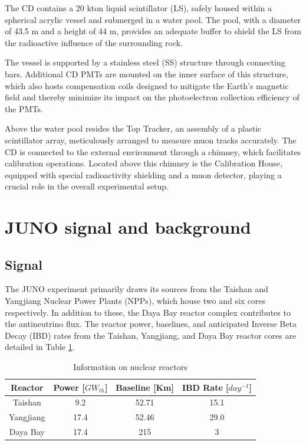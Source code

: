 The CD contains a 20 kton liquid scintillator (LS), safely housed within a spherical acrylic vessel and submerged in a water pool. The pool, with a diameter of 43.5 m and a height of 44 m, provides an adequate buffer to shield the LS from the radioactive influence of the surrounding rock.

The vessel is supported by a stainless steel (SS) structure through connecting bars. Additional CD PMTs are mounted on the inner surface of this structure, which also hosts compensation coils designed to mitigate the Earth's magnetic field and thereby minimize its impact on the photoelectron collection efficiency of the PMTs.

Above the water pool resides the Top Tracker, an assembly of a plastic scintillator array, meticulously arranged to measure muon tracks accurately. The CD is connected to the external environment through a chimney, which facilitates calibration operations. Located above this chimney is the Calibration House, equipped with special radioactivity shielding and a muon detector, playing a crucial role in the overall experimental setup.

\newpage

\section{JUNO signal and background}

\subsection{Signal}

The JUNO experiment primarily draws its sources from the Taishan and Yangjiang Nuclear Power Plants (NPPs), which house two and six cores respectively. In addition to these, the Daya Bay reactor complex contributes to the antineutrino flux. The reactor power, baselines, and anticipated Inverse Beta Decay (IBD) rates from the Taishan, Yangjiang, and Daya Bay reactor cores are detailed in Table \ref{tab:IBD_reactor_source}.


\begin{table}[htp]
	\centering
	\begin{tabular}{cccc}
		\toprule
		Reactor & Power [$GW_{th}$] & Baseline [Km]  & IBD Rate [$day^{-1}$] \\\midrule
		Taishan & 9.2 & 52.71 &	15.1	\\
		Yangjiang & 17.4 & 52.46 & 29.0	\\
		Daya Bay & 17.4 & 215 &	3\\
		\bottomrule
	\end{tabular}
	\caption{Information on nuclear reactors}
	\label{tab:IBD_reactor_source}
\end{table}


